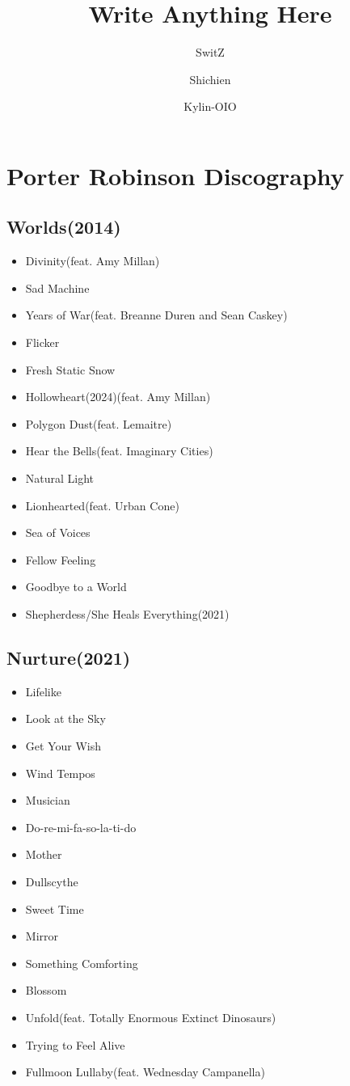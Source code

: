\documentclass{article}
\author{SwitZ \and Shichien \and Kylin-OIO}
\title{Write Anything Here}
\begin{document}
\maketitle
\section{Porter Robinson Discography}
\subsection{Worlds(2014)}
\begin{itemize}
    \item Divinity(feat. Amy Millan)
    \item Sad Machine
    \item Years of War(feat. Breanne Duren and Sean Caskey)
    \item Flicker
    \item Fresh Static Snow
    \item Hollowheart(2024)(feat. Amy Millan)
    \item Polygon Dust(feat. Lemaitre)
    \item Hear the Bells(feat. Imaginary Cities)
    \item Natural Light
    \item Lionhearted(feat. Urban Cone)
    \item Sea of Voices
    \item Fellow Feeling
    \item Goodbye to a World
    \item Shepherdess/She Heals Everything(2021)
\end{itemize}
\subsection{Nurture(2021)}
\begin{itemize}
    \item Lifelike
    \item Look at the Sky
    \item Get Your Wish
    \item Wind Tempos
    \item Musician
    \item Do-re-mi-fa-so-la-ti-do
    \item Mother
    \item Dullscythe
    \item Sweet Time
    \item Mirror
    \item Something Comforting
    \item Blossom
    \item Unfold(feat. Totally Enormous Extinct Dinosaurs)
    \item Trying to Feel Alive
    \item Fullmoon Lullaby(feat. Wednesday Campanella)
\end{itemize}
\end{document}
